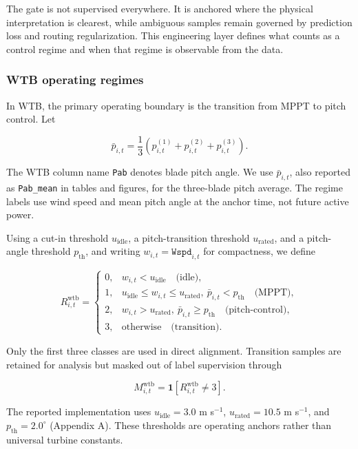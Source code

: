 \documentclass[
  11pt]{article}
\begin{document}
The gate is not supervised everywhere. It is anchored where the physical
interpretation is clearest, while ambiguous samples remain governed by
prediction loss and routing regularization. This engineering layer
defines what counts as a control regime and when that regime is
observable from the data.

\subsubsection{WTB operating regimes}\label{wtb-operating-regimes}

In WTB, the primary operating boundary is the transition from MPPT to
pitch control. Let

\[
\bar{p}_{i,t} = \frac{1}{3}\left(p^{(1)}_{i,t}+p^{(2)}_{i,t}+p^{(3)}_{i,t}\right).
\]

The WTB column name \texttt{Pab} denotes blade pitch angle. We use
\(\bar{p}_{i,t}\), also reported as \texttt{Pab\_mean} in tables and
figures, for the three-blade pitch average. The regime labels use wind
speed and mean pitch angle at the anchor time, not future active power.

Using a cut-in threshold \(u_{\mathrm{idle}}\), a pitch-transition
threshold \(u_{\mathrm{rated}}\), and a pitch-angle threshold
\(p_{\mathrm{th}}\), and writing \(w_{i,t}=\texttt{Wspd}_{i,t}\) for
compactness, we define

\[
R^{\mathrm{wtb}}_{i,t} =
\begin{cases}
0, & w_{i,t}<u_{\mathrm{idle}} \quad \text{(idle)},\\
1, & u_{\mathrm{idle}}\le w_{i,t}\le u_{\mathrm{rated}},\ \bar{p}_{i,t}<p_{\mathrm{th}} \quad \text{(MPPT)},\\
2, & w_{i,t}>u_{\mathrm{rated}},\ \bar{p}_{i,t}\ge p_{\mathrm{th}} \quad \text{(pitch-control)},\\
3, & \text{otherwise} \quad \text{(transition)}.
\end{cases}
\]

Only the first three classes are used in direct alignment. Transition
samples are retained for analysis but masked out of label supervision
through

\[
M^{\mathrm{wtb}}_{i,t} = \mathbf{1}[R^{\mathrm{wtb}}_{i,t} \neq 3].
\]

The reported implementation uses \(u_{\mathrm{idle}}=3.0\) m s\(^{-1}\),
\(u_{\mathrm{rated}}=10.5\) m s\(^{-1}\), and
\(p_{\mathrm{th}}=2.0^\circ\) (Appendix A). These thresholds are
operating anchors rather than universal turbine constants.
\end{document}
